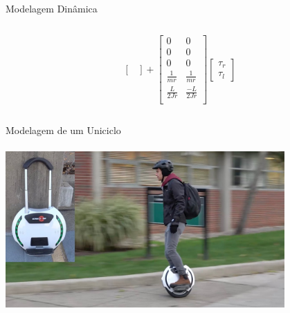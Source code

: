 \documentclass{beamer}
\begin{document}
\begin{frame}{Modelagem Dinâmica}
\begin{columns}
\begin{column}[c]{0.6\textwidth}
\begin{equation*}
\begin{bmatrix}
                \end{bmatrix} + 
                \begin{bmatrix}
                    0 & 0 \\
                    0 & 0 \\
                    0 & 0 \\
                    \frac{1}{mr} & \frac{1}{mr} \\
                    \frac{L}{2Jr} & \frac{-L}{2Jr} \\
                \end{bmatrix}
                \begin{bmatrix}
                    \tau_r \\ \tau_l
                \end{bmatrix}
            \end{equation*}
        \end{column}
    \end{columns}

\end{frame}

\begin{frame}[c]{Modelagem de um Uniciclo}
    \framesubtitle{}
    \centering
    \includegraphics[width=0.8\textwidth]{./images/unicycle.jpg}
\end{frame}
\end{document}
